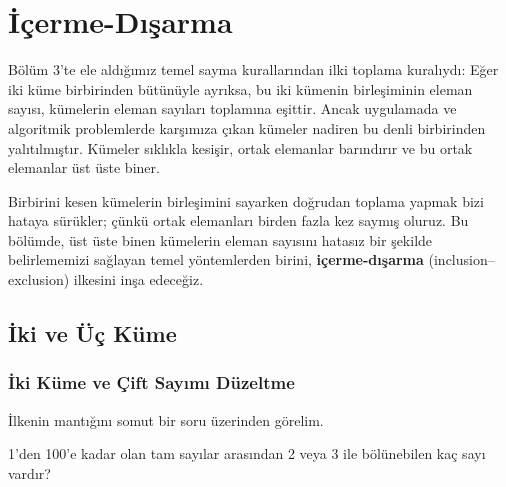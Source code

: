 \chapter[İçerme-Dışarma · \textit{Orta}]{İçerme-Dışarma}

Bölüm 3'te ele aldığımız temel sayma kurallarından ilki toplama
kuralıydı: Eğer iki küme birbirinden bütünüyle ayrıksa, bu iki kümenin
birleşiminin eleman sayısı, kümelerin eleman sayıları toplamına eşittir. Ancak
uygulamada ve algoritmik problemlerde karşımıza çıkan kümeler nadiren bu denli
birbirinden yalıtılmıştır. Kümeler sıklıkla kesişir, ortak elemanlar barındırır
ve bu ortak elemanlar üst üste biner.

Birbirini kesen kümelerin birleşimini sayarken doğrudan toplama yapmak
bizi hataya sürükler; çünkü ortak elemanları birden fazla kez saymış oluruz.
Bu bölümde, üst üste binen kümelerin eleman sayısını hatasız bir şekilde
belirlememizi sağlayan temel yöntemlerden birini, \textbf{içerme-dışarma}
(inclusion--exclusion) ilkesini inşa edeceğiz.

\section{İki ve Üç Küme}

\subsection{İki Küme ve Çift Sayımı Düzeltme}

İlkenin mantığını somut bir soru üzerinden görelim.

\begin{example} 1'den 100'e kadar olan tam sayılar arasından 2 veya 3 ile
bölünebilen kaç sayı vardır? \end{example}

